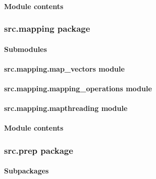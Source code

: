 \documentclass[letterpaper,10pt,english]{sphinxmanual}
\begin{document}
\paragraph{Module contents}
\label{src.guesser:module-src.guesser}\label{src.guesser:module-contents}

\subsubsection{src.mapping package}
\label{src.mapping::doc}\label{src.mapping:src-mapping-package}

\paragraph{Submodules}
\label{src.mapping:submodules}

\paragraph{src.mapping.map\_vectors module}
\label{src.mapping:src-mapping-map-vectors-module}

\paragraph{src.mapping.mapping\_operations module}
\label{src.mapping:src-mapping-mapping-operations-module}

\paragraph{src.mapping.mapthreading module}
\label{src.mapping:src-mapping-mapthreading-module}

\paragraph{Module contents}
\label{src.mapping:module-src.mapping}\label{src.mapping:module-contents}

\subsubsection{src.prep package}
\label{src.prep::doc}\label{src.prep:src-prep-package}

\paragraph{Subpackages}
\label{src.prep:subpackages}
\end{document}
